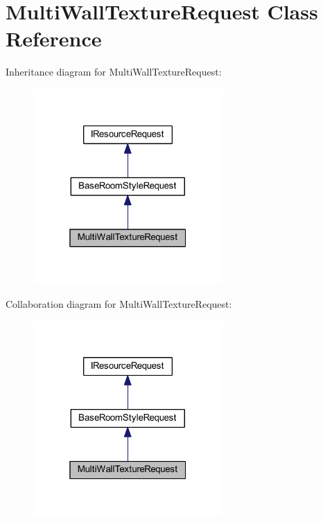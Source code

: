 \hypertarget{class_multi_wall_texture_request}{}\section{Multi\+Wall\+Texture\+Request Class Reference}
\label{class_multi_wall_texture_request}


Inheritance diagram for Multi\+Wall\+Texture\+Request\+:
\nopagebreak
\begin{figure}[H]
\begin{center}
\leavevmode
\includegraphics[width=205pt]{class_multi_wall_texture_request__inherit__graph}
\end{center}
\end{figure}


Collaboration diagram for Multi\+Wall\+Texture\+Request\+:
\nopagebreak
\begin{figure}[H]
\begin{center}
\leavevmode
\includegraphics[width=205pt]{class_multi_wall_texture_request__coll__graph}
\end{center}
\end{figure}
